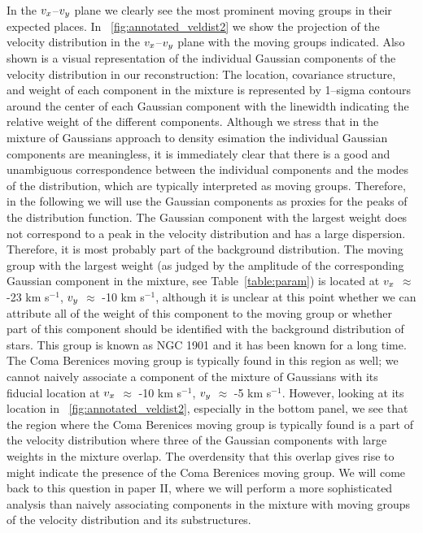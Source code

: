 In the $v_x$--$v_y$ plane we clearly see the most prominent moving
groups in their expected places. In
\figurename~\ref{fig:annotated_veldist2} we show the projection of the
velocity distribution in the $v_x$--$v_y$ plane with the moving groups
indicated. Also shown is a visual representation of the individual
Gaussian components of the velocity distribution in our
reconstruction: The location, covariance structure, and weight of each
component in the mixture is represented by 1--sigma contours around
the center of each Gaussian component with the linewidth indicating
the relative weight of the different components. Although we stress
that in the mixture of Gaussians approach to density esimation the
individual Gaussian components are meaningless, it is immediately
clear that there is a good and unambiguous correspondence between the
individual components and the modes of the distribution, which are
typically interpreted as moving groups. Therefore, in the following we
will use the Gaussian components as proxies for the peaks of the
distribution function.  The Gaussian component with the largest weight
does not correspond to a peak in the velocity distribution and has a
large dispersion. Therefore, it is most probably part of the
background distribution.  The moving group with the largest weight (as
judged by the amplitude of the corresponding Gaussian component in the
mixture, see Table~\ref{table:param}) is located at $v_x$ $\approx$
-23 km s$^{-1}$, $v_y$ $\approx$ -10 km s$^{-1}$, although it is
unclear at this point whether we can attribute all of the weight of
this component to the moving group or whether part of this component
should be identified with the background distribution of stars. This
group is known as NGC 1901 and it has been known for a long time. The
Coma Berenices moving group is typically found in this region as well;
we cannot naively associate a component of the mixture of Gaussians
with its fiducial location at $v_x$ $\approx$ -10 km s$^{-1}$, $v_y$
$\approx$ -5 km s$^{-1}$. However, looking at its location in
\figurename~\ref{fig:annotated_veldist2}, especially in the bottom
panel, we see that the region where the Coma Berenices moving group is
typically found is a part of the velocity distribution where three of
the Gaussian components with large weights in the mixture overlap. The
overdensity that this overlap gives rise to might indicate the
presence of the Coma Berenices moving group. We will come back to this
question in paper II, where we will perform a more sophisticated
analysis than naively associating components in the mixture with
moving groups of the velocity distribution and its substructures.

